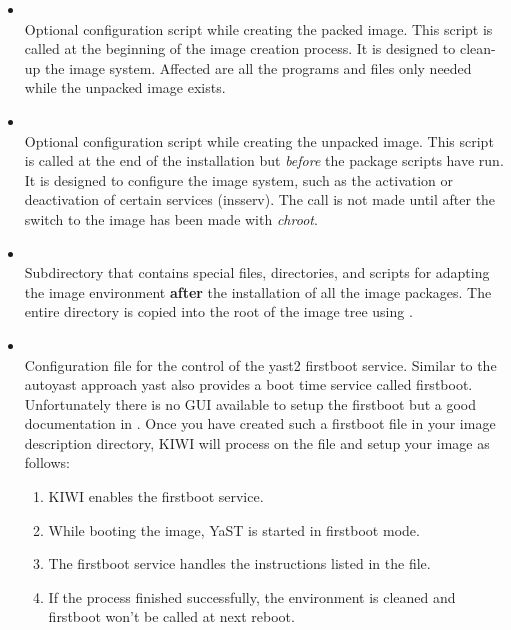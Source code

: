 \begin{itemize}
\item {}\\
      Optional configuration script while creating the packed image.
      This script is called at the beginning of the image creation process.
      It is designed to clean-up the image system. Affected are all the
      programs and files only needed while the unpacked image exists.

\item {}\\
      Optional configuration script while creating the unpacked image. This
      script is called at the end of the installation but \emph{before}
      the package scripts have run. It is designed to configure the image
      system, such as the activation or deactivation of certain services
      (insserv). The call is not made until after the switch to the image
      has been made with \emph{chroot}.

\item {}\\
      Subdirectory that contains special files, directories, and scripts for
      adapting the image environment \textbf{after} the installation of all the
      image packages. The entire directory is copied into the root of the
      image tree using  .

\item {}\\
      Configuration file for the control of the yast2 firstboot service.
      Similar to the autoyast approach yast also provides a boot time
      service called firstboot. Unfortunately there is no GUI available
      to setup the firstboot but a good documentation in
      . Once you have 
      created such a firstboot file in your image description directory, KIWI
      will process on the file and setup your image as follows:

      \begin{enumerate}
      \item KIWI enables the firstboot service.
      \item While booting the image, YaST is started in firstboot mode.
      \item The firstboot service handles the instructions listed in the
            file\linebreak {}.
      \item If the process finished successfully, the environment is
            cleaned and firstboot won't be called at next reboot.
      \end{enumerate}


\end{itemize}
